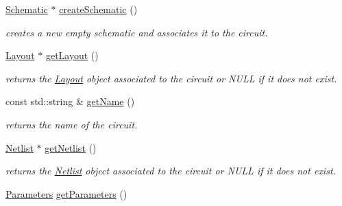 \begin{DoxyCompactItemize}
\mbox{\hyperlink{class_open_chams_1_1_schematic}{Schematic}} $\ast$ \mbox{\hyperlink{class_open_chams_1_1_circuit_a57a79a9916df4512648bb195decb7250}{create\+Schematic}} ()
\begin{DoxyCompactList}\small\item\em creates a new empty schematic and associates it to the circuit. \end{DoxyCompactList}\item 
\mbox{\label{class_open_chams_1_1_circuit_a403a908943f9a3e820fd25a86d00531d}} 
\mbox{\hyperlink{class_open_chams_1_1_layout}{Layout}} $\ast$ \mbox{\hyperlink{class_open_chams_1_1_circuit_a403a908943f9a3e820fd25a86d00531d}{get\+Layout}} ()
\begin{DoxyCompactList}\small\item\em returns the \mbox{\hyperlink{class_open_chams_1_1_layout}{Layout}} object associated to the circuit or N\+U\+LL if it does not exist. \end{DoxyCompactList}\item 
\mbox{\label{class_open_chams_1_1_circuit_a2858c0c4e8b5108f041237cf5a802029}} 
const std\+::string \& \mbox{\hyperlink{class_open_chams_1_1_circuit_a2858c0c4e8b5108f041237cf5a802029}{get\+Name}} ()
\begin{DoxyCompactList}\small\item\em returns the name of the circuit. \end{DoxyCompactList}\item 
\mbox{\label{class_open_chams_1_1_circuit_a4085d6a7b6958ffdd7ab5df7e6d6e53f}} 
\mbox{\hyperlink{class_open_chams_1_1_netlist}{Netlist}} $\ast$ \mbox{\hyperlink{class_open_chams_1_1_circuit_a4085d6a7b6958ffdd7ab5df7e6d6e53f}{get\+Netlist}} ()
\begin{DoxyCompactList}\small\item\em returns the \mbox{\hyperlink{class_open_chams_1_1_netlist}{Netlist}} object associated to the circuit or N\+U\+LL if it does not exist. \end{DoxyCompactList}\item 
\mbox{\label{class_open_chams_1_1_circuit_a2e51ad4344607fc279c5c8cda4edae02}} 
\mbox{\hyperlink{class_open_chams_1_1_parameters}{Parameters}} \mbox{\hyperlink{class_open_chams_1_1_circuit_a2e51ad4344607fc279c5c8cda4edae02}{get\+Parameters}} ()

\end{DoxyCompactItemize}
